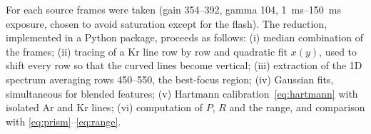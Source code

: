 For each source \NFrames{} frames were taken (gain 354--392, gamma 104, \SIrange{1}{150}{\milli\second} exposure, chosen to avoid saturation except for the flash). The reduction, implemented in a Python package, proceeds as follows: (i) median combination of the frames; (ii) tracing of a Kr line row by row and quadratic fit $x(y)$, used to shift every row so that the curved lines become vertical; (iii) extraction of the 1D spectrum averaging rows 450--550, the best-focus region; (iv) Gaussian fits, simultaneous for blended features; (v) Hartmann calibration~\eqref{eq:hartmann} with isolated Ar and Kr lines; (vi) computation of $P$, $R$ and the range, and comparison with \eqref{eq:prism}--\eqref{eq:range}.
